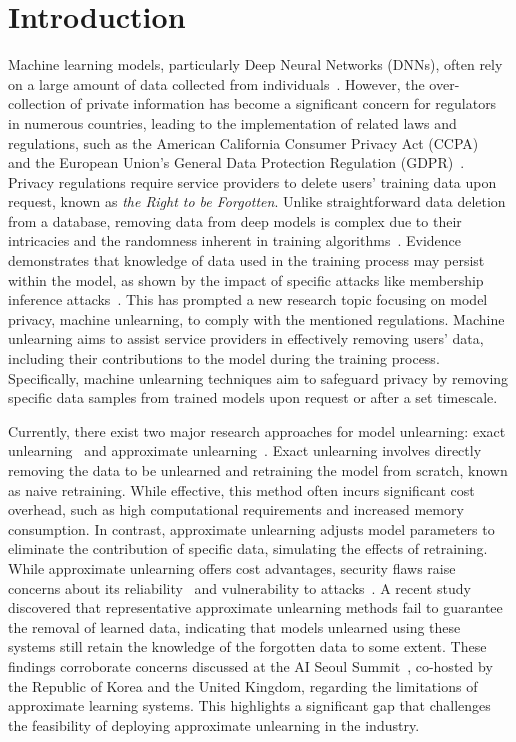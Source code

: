 \documentclass[conference,compsoc]{IEEEtran}
\begin{document}
\section{Introduction}
\label{sec:introduction}

Machine learning models, particularly Deep Neural Networks (DNNs), often rely on a large amount of data collected from individuals~\cite{de2021critical}. 
However, the over-collection of private information has become a significant concern for regulators in numerous countries, leading to the implementation of related laws and regulations, such as the American California Consumer Privacy Act (CCPA)~\cite{harding2019understanding} and the European Union's General Data Protection Regulation (GDPR)~\cite{mantelero2013eu}.
Privacy regulations require service providers to delete users' training data upon request, known as \textit{the Right to be Forgotten}. 
Unlike straightforward data deletion from a database, removing data from deep models is complex due to their intricacies and the randomness inherent in training algorithms~\cite{thudi2022unrolling}. Evidence demonstrates that knowledge of data used in the training process may persist within the model, as shown by the impact of specific attacks like membership inference attacks~\cite{maini2024tofu}. This has prompted a new research topic focusing on model privacy, \ie machine unlearning, to comply with the mentioned regulations. Machine unlearning aims to assist service providers in effectively removing users' data, including their contributions to the model during the training process. Specifically, machine unlearning techniques aim to safeguard privacy by removing specific data samples from trained models upon request or after a set timescale. 

Currently, there exist two major research approaches for model unlearning: exact unlearning~\cite{bourtoule2021machine, chen2022recommendation, yan2022arcane} and approximate unlearning~\cite{gupta2021adaptive, lin2023erm}. 
Exact unlearning involves directly removing the data to be unlearned and retraining the model from scratch, known as naive retraining. While effective, this method often incurs significant cost overhead, such as high computational requirements and increased memory consumption. 
In contrast, approximate unlearning adjusts model parameters to eliminate the contribution of specific data, simulating the effects of retraining. While approximate unlearning offers cost advantages, security flaws raise concerns about its reliability~\cite{shumailov2021manipulating, thudi2022necessity} and vulnerability to attacks~\cite{hu2024duty, hu2024learn}. A recent study~\cite{maini2024tofu} discovered that representative approximate unlearning methods fail to guarantee the removal of learned data, indicating that models unlearned using these systems still retain the knowledge of the forgotten data to some extent. These findings corroborate concerns discussed at the AI Seoul Summit~\cite{bengio2024international}, 
co-hosted by the Republic of Korea and the United Kingdom, regarding the limitations of approximate learning systems. This highlights a significant gap that challenges the feasibility of deploying approximate unlearning in the industry.
\end{document}

